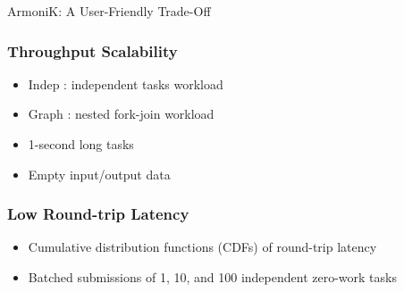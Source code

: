 \documentclass[10pt,aspectratio=1609]{beamer}
\begin{document}
\begin{section}{ArmoniK: A User-Friendly Trade-Off}
 \begin{frame}
   \frametitle{Throughput Scalability}
   \begin{itemize}
     \item Indep : independent tasks workload
     \item Graph : nested fork-join workload
     \item 1-second long tasks
     \item Empty input/output data
   \end{itemize}
   \begin{center}
     
   \end{center}
 \end{frame}

 \begin{frame}
   \frametitle{Low Round-trip Latency}
   \begin{itemize}
     \item Cumulative distribution functions (CDFs) of round-trip latency
     \item Batched submissions of 1, 10, and 100 independent zero-work tasks
   \end{itemize}
   \begin{center}
     
   \end{center}
 \end{frame}

\end{section}
\end{document}
